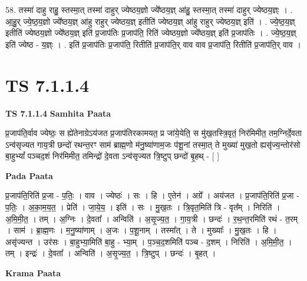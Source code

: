 \documentclass[17pt]{extarticle}
\begin{document}
58. तस्मा॑ दाहु राहु॒ स्तस्मा॒त् तस्मा॑ दाहुर् ज्येष्ठय॒ज्ञो ज्ये᳚ष्ठय॒ज्ञ् आ॑हु॒ स्तस्मा॒त् तस्मा॑ दाहुर् ज्येष्ठय॒ज्ञ्ः । . आ॒हु॒र् ज्ये॒ष्ठ॒य॒ज्ञो ज्ये᳚ष्ठय॒ज्ञ् आ॑हु राहुर् ज्येष्ठय॒ज्ञ् इतीति॑ ज्येष्ठय॒ज्ञ् आ॑हु राहुर् ज्येष्ठय॒ज्ञ् इति॑ । . ज्ये॒ष्ठ॒य॒ज्ञ् इतीति॑ ज्येष्ठय॒ज्ञो ज्ये᳚ष्ठय॒ज्ञ् इति॑ प्र॒जाप॑तिः प्र॒जाप॑ति॒ रिति॑ ज्येष्ठय॒ज्ञो ज्ये᳚ष्ठय॒ज्ञ् इति॑ प्र॒जाप॑तिः । . ज्ये॒ष्ठ॒य॒ज्ञ् इति॑ ज्येष्ठ - य॒ज्ञ्ः । . इति॑ प्र॒जाप॑तिः प्र॒जाप॑ति॒ रितीति॑ प्र॒जाप॑ति॒र् वाव वाव प्र॒जाप॑ति॒ रितीति॑ प्र॒जाप॑ति॒र् वाव । \newline
\pagebreak
{}

\section{ TS 7.1.1.4 }

\textbf{TS 7.1.1.4 } \newline
\textbf{Samhita Paata} \newline

प्र॒जाप॑ति॒र्वाव ज्येष्ठः॒ स ह्ये॑तेनाग्रेऽय॑जत प्र॒जाप॑तिरकामयत॒ प्र जा॑ये॒येति॒ स मु॑ख॒तस्त्रि॒वृतं॒ निर॑मिमीत॒ तम॒ग्निर्दे॒वता ऽन्व॑सृज्यत गाय॒त्री छन्दो॑ रथन्त॒रꣳ साम॑ ब्राह्म॒णो म॑नु॒ष्या॑णाम॒जः प॑शू॒नां तस्मा॒त् ते मुख्या॑ मुख॒तो ह्यसृ॑ज्य॒न्तोर॑सो बा॒हुभ्यां᳚ पञ्चद॒शं निर॑मिमीत॒ तमिन्द्रो॑ दे॒वता ऽन्व॑सृज्यत त्रि॒ष्टुप् छन्दो॑ बृ॒हथ् - [  ] \newline

\textbf{Pada Paata} \newline

प्र॒जाप॑ति॒रिति॑ प्र॒जा - प॒तिः॒ । वाव । ज्येष्ठः॑ । सः । हि । ए॒तेन॑ । अग्रे᳚ । अय॑जत । प्र॒जाप॑ति॒रिति॑ प्र॒जा - प॒तिः॒ । अ॒का॒म॒य॒त॒ । प्रेति॑ । जा॒ये॒य॒ । इति॑ । सः । मु॒ख॒तः । त्रि॒वृत॒मिति॑ त्रि - वृत᳚म् । निरिति॑ । अ॒मि॒मी॒त॒ । तम् । अ॒ग्निः । दे॒वता᳚ । अन्विति॑ । अ॒सृ॒ज्य॒त॒ । गा॒य॒त्री । छन्दः॑ । र॒थ॒न्त॒रमिति॑ रथं - त॒रम् । साम॑ । ब्रा॒ह्म॒णः । म॒नु॒ष्या॑णाम् । अ॒जः । प॒शू॒नाम् । तस्मा᳚त् । ते । मुख्याः᳚ । मु॒ख॒तः । हि । असृ॑ज्यन्त । उर॑सः । बा॒हुभ्या॒मिति॑ बा॒हु - भ्या॒म् । प॒ञ्च॒द॒शमिति॑ पञ्च - द॒शम् । निरिति॑ । अ॒मि॒मी॒त॒ । तम् । इन्द्रः॑ । दे॒वता᳚ । अन्विति॑ । अ॒सृ॒ज्य॒त॒ । त्रि॒ष्टुप् । छन्दः॑ । बृ॒हत् ।  \newline


\textbf{Krama Paata} \newline
\end{document}
